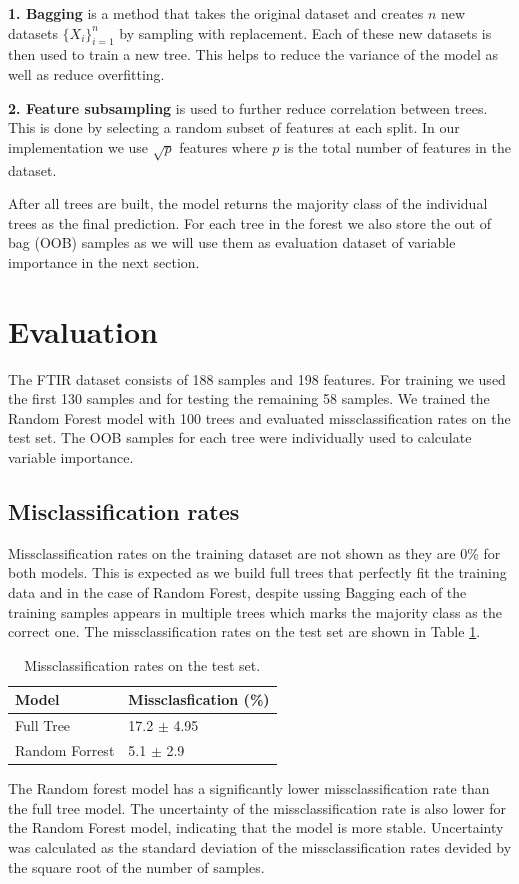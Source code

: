 \documentclass[fleqn,moreauthors,10pt]{ds_report}
\begin{document}
\textbf{1. Bagging} is a method that takes the original dataset and creates $n$ new datasets $\{X_i\}_{i=1}^n$ by sampling with replacement.
Each of these new datasets is then used to train a new tree.
This helps to reduce the variance of the model as well as reduce overfitting.

\textbf{2. Feature subsampling} is used to further reduce correlation between trees.
This is done by selecting a random subset of features at each split.
In our implementation we use $\sqrt{p}$ features where $p$ is the total number of features in the dataset.

After all trees are built, the model returns the majority class of the individual trees as the final prediction.
For each tree in the forest we also store the out of bag (OOB) samples as we will use them as evaluation dataset of variable importance in the next section.


\section*{Evaluation}
The FTIR dataset consists of 188 samples and 198 features.
For training we used the first 130 samples and for testing the remaining 58 samples.
We trained the Random Forest model with 100 trees and evaluated missclassification rates on the test set.
The OOB samples for each tree were individually used to calculate variable importance.

\subsection*{Misclassification rates}
Missclassification rates on the training dataset are not shown as they are 0\% for both models.
This is expected as we build full trees that perfectly fit the training data and in the case of Random Forest, despite ussing Bagging each of the training samples appears in multiple trees which marks the majority class as the correct one. 
The missclassification rates on the test set are shown in Table \ref{tab:missclassification}.
\begin{table}[!ht]
	\centering
	\begin{tabular}{|l|l|}\hline
        Model & Missclasfication (\%) \\ \hline
        Full Tree & 17.2 $\pm$ 4.95 \\ \hline
        Random Forrest & 5.1 $\pm$ 2.9 \\ \hline
    \end{tabular}
	\caption{Missclassification rates on the test set.}
    \label{tab:missclassification}
\end{table}
The Random forest model has a significantly lower missclassification rate than the full tree model.
The uncertainty of the missclassification rate is also lower for the Random Forest model, indicating that the model is more stable.
Uncertainty was calculated as the standard deviation of the missclassification rates devided by the square root of the number of samples.
\end{document}
